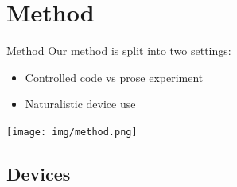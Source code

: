 \documentclass[xcolor={dvipsnames,table},12pt]{beamer}
\begin{document}
\section{Method}
\begin{frame}{Method}
    Our method is split into two settings:

    \begin{itemize}
            \item Controlled code vs prose experiment
            \item Naturalistic device use
    \end{itemize}

    \texttt{[image: img/method.png]}
\end{frame}

\subsection{Devices}
\end{document}
